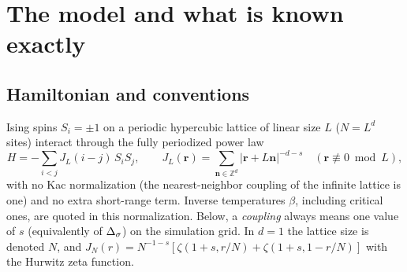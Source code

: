 \section{The model and what is known exactly}\label{mc:sec:model}
\subsection{Hamiltonian and conventions}
Ising spins $S_i=\pm1$ on a periodic hypercubic lattice of linear size $L$ ($N=L^d$ sites) interact through the fully periodized power law
\begin{equation}
 H=-\sum_{i<j}J_L(i-j)\,S_iS_j,\qquad J_L(\mathbf r)=\sum_{\mathbf n\in\mathbb Z^d}|\mathbf r+L\mathbf n|^{-d-s}\quad(\mathbf r\not\equiv0\bmod L),
 \label{mc:eq:H}
\end{equation}
with no Kac normalization (the nearest-neighbor coupling of the infinite lattice is one) and no extra short-range term. Inverse temperatures
$\beta$, including critical ones, are quoted in this normalization. Below, a \emph{coupling} always means one value of $s$ (equivalently of
$\Delta_\sigma$) on the simulation grid. In $d=1$ the lattice size is denoted $N$, and
$J_N(r)=N^{-1-s}[\zeta(1+s,r/N)+\zeta(1+s,1-r/N)]$ with the Hurwitz zeta function.

